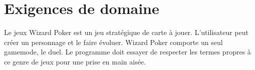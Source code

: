 \section{Exigences de domaine}
Le jeux Wizard Poker est un jeu stratégique de carte à jouer. L'utilisateur peut créer un personnage et le faire évoluer. Wizard Poker comporte un seul gamemode, le duel. Le programme doit essayer de respecter les termes propres à ce genre de jeux pour une prise en main aisée.\\
